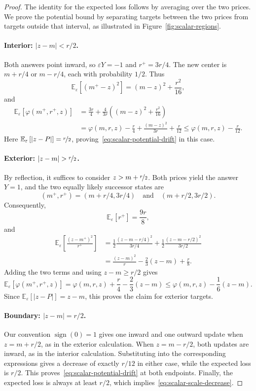 \documentclass[11pt]{article}
\newcommand{\Esub}[2]{\mathbb E_{#1}\left[#2\right]}
\begin{document}
\begin{proof}
The identity for the expected loss follows by averaging over the two prices. We prove the potential bound by separating targets between the two prices from targets {outside that interval}, as illustrated in Figure~\ref{fig:scalar-regions}.

\paragraph{Interior: $|z-m|<r/2$.}
Both answers point inward, so $\varepsilon Y=-1$ and $r^+=3r/4$. The new center is $m+r/4$ or $m-r/4$, each with probability $1/2$. Thus
\[
 \Esub{\varepsilon}{(m^+-z)^2}=(m-z)^2+\frac{r^2}{16},
\]
and
\begin{align*}
 \Esub{\varepsilon}{\varphi(m^+,r^+,z)}
 &=\frac{3r}{4}+\frac4{3r}\left((m-z)^2+\frac{r^2}{16}\right)\\
 &=\varphi(m,r,z)-\frac r4+\frac{(m-z)^2}{3r}+\frac r{12}
 \le\varphi(m,r,z)-\frac r{12}.
\end{align*}
Here $\Esub{\varepsilon}{|z-P|}=\nicefrac{r}2$, proving~\eqref{eq:scalar-potential-drift} in this case.

\paragraph{Exterior: $|z-m|>\nicefrac{r}2$.}
{By reflection,} it suffices to consider $z>m+\nicefrac{r}2$. Both prices {yield the answer} $Y=1$, and the two equally likely successor states are
\[
 (m^+,r^+)=(m+r/4,3r/4)
 \quad\text{and}\quad(m+r/2,3r/2).
\]
Consequently,
\[
 \Esub{\varepsilon}{r^+}=\frac{9r}{8},
\]
and
\begin{align*}
 \Esub{\varepsilon}{\frac{(z-m^+)^2}{r^+}}
 &=\frac12\frac{(z-m-r/4)^2}{3r/4}
   +\frac12\frac{(z-m-r/2)^2}{3r/2}\\
 &=\frac{(z-m)^2}{r}-\frac23(z-m)+\frac r8.
\end{align*}
Adding the two terms and using $z-m\ge r/2$ gives
\[
 \Esub{\varepsilon}{\varphi(m^+,r^+,z)}
 =\varphi(m,r,z)+\frac r4-\frac23(z-m)
 \le\varphi(m,r,z)-\frac16(z-m).
\]
Since $\Esub{\varepsilon}{|z-P|}=z-m$, this proves the claim for exterior targets.

\paragraph{Boundary: $|z-m|=r/2$.}
Our convention $\operatorname{sign}(0)=1$ gives one inward and one outward update when $z=m+r/2$, as in the exterior calculation. When $z=m-r/2$, both updates are inward, as in the interior calculation. Substituting into the corresponding expressions gives a decrease of exactly $r/12$ in either case, while the expected loss is $r/2$. This proves~\eqref{eq:scalar-potential-drift} at both endpoints. Finally, the expected loss is always at least $r/2$, which implies~\eqref{eq:scalar-scale-decrease}.
\end{proof}
\end{document}
